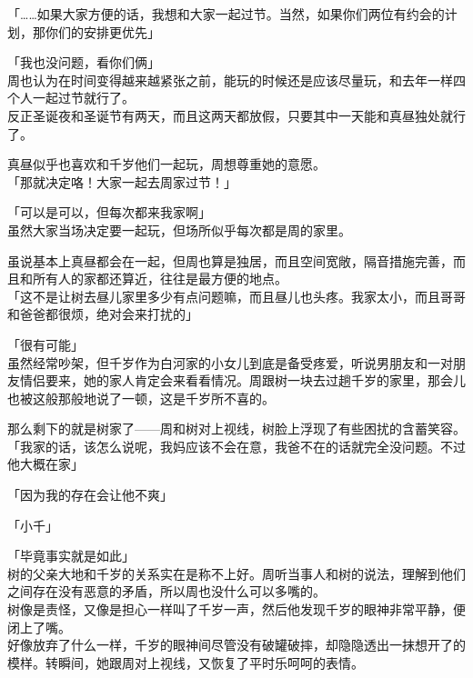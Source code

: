 「……如果大家方便的话，我想和大家一起过节。当然，如果你们两位有约会的计划，那你们的安排更优先」

「我也没问题，看你们俩」\\

周也认为在时间变得越来越紧张之前，能玩的时候还是应该尽量玩，和去年一样四个人一起过节就行了。\\

反正圣诞夜和圣诞节有两天，而且这两天都放假，只要其中一天能和真昼独处就行了。

真昼似乎也喜欢和千岁他们一起玩，周想尊重她的意愿。\\

「那就决定咯！大家一起去周家过节！」

「可以是可以，但每次都来我家啊」\\

虽然大家当场决定要一起玩，但场所似乎每次都是周的家里。

虽说基本上真昼都会在一起，但周也算是独居，而且空间宽敞，隔音措施完善，而且和所有人的家都还算近，往往是最方便的地点。\\

「这不是让树去昼儿家里多少有点问题嘛，而且昼儿也头疼。我家太小，而且哥哥和爸爸都很烦，绝对会来打扰的」

「很有可能」\\

虽然经常吵架，但千岁作为白河家的小女儿到底是备受疼爱，听说男朋友和一对朋友情侣要来，她的家人肯定会来看看情况。周跟树一块去过趟千岁的家里，那会儿也被这般那般地说了一顿，这是千岁所不喜的。

那么剩下的就是树家了——周和树对上视线，树脸上浮现了有些困扰的含蓄笑容。\\

「我家的话，该怎么说呢，我妈应该不会在意，我爸不在的话就完全没问题。不过他大概在家」

「因为我的存在会让他不爽」

「小千」

「毕竟事实就是如此」\\

树的父亲大地和千岁的关系实在是称不上好。周听当事人和树的说法，理解到他们之间存在没有恶意的矛盾，所以周也没什么可以多嘴的。\\

树像是责怪，又像是担心一样叫了千岁一声，然后他发现千岁的眼神非常平静，便闭上了嘴。\\

好像放弃了什么一样，千岁的眼神间尽管没有破罐破摔，却隐隐透出一抹想开了的模样。转瞬间，她跟周对上视线，又恢复了平时乐呵呵的表情。\\

